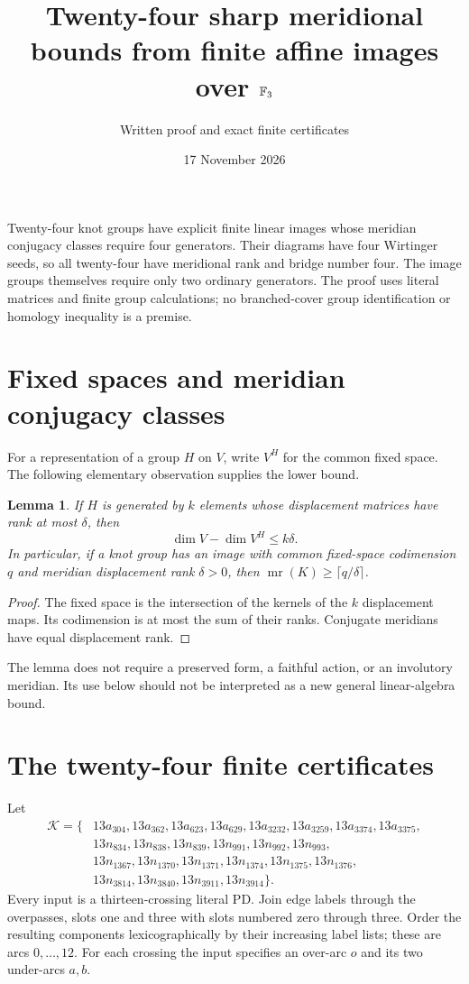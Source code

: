 \documentclass[11pt]{article}
\title{Twenty-four sharp meridional bounds from finite affine images over $\mathbb F_3$}
\author{Written proof and exact finite certificates}
\date{17 November 2026}
\newtheorem{lemma}{Lemma}
\newcommand{\mr}{\operatorname{mr}}
\begin{document}
\maketitle

Twenty-four knot groups have explicit finite linear images whose
meridian conjugacy classes require four generators. Their diagrams
have four Wirtinger seeds, so all twenty-four have meridional rank and
bridge number four. The image groups themselves require only two
ordinary generators. The proof uses literal matrices and finite
group calculations; no branched-cover group identification or
homology inequality is a premise.

\section{Fixed spaces and meridian conjugacy classes}

For a representation of a group $H$ on $V$, write $V^H$ for the
common fixed space. The following elementary observation supplies
the lower bound.

\begin{lemma}\label{lem:fixed}
If $H$ is generated by $k$ elements whose displacement matrices
have rank at most $\delta$, then
\[
                   \dim V-\dim V^H\le k\delta.
\]
In particular, if a knot group has an image with common fixed-space
codimension $q$ and meridian displacement rank $\delta>0$, then
$\mr(K)\ge\lceil q/\delta\rceil$.
\end{lemma}
\begin{proof}
The fixed space is the intersection of the kernels of the $k$
displacement maps. Its codimension is at most the sum of their
ranks. Conjugate meridians have equal displacement rank.
\end{proof}

The lemma does not require a preserved form, a faithful action,
or an involutory meridian. Its use below should not be interpreted
as a new general linear-algebra bound.

\section{The twenty-four finite certificates}

Let
\[
\begin{split}
\mathcal K=\{&13a_{304},13a_{362},13a_{623},13a_{629},
13a_{3232},13a_{3259},13a_{3374},13a_{3375},\\
&13n_{834},13n_{838},13n_{839},13n_{991},13n_{992},13n_{993},\\
&13n_{1367},13n_{1370},13n_{1371},13n_{1374},13n_{1375},13n_{1376},\\
&13n_{3814},13n_{3840},13n_{3911},13n_{3914}\}.
\end{split}
\]
Every input is a thirteen-crossing literal PD. Join edge labels
through the overpasses, slots one and three with slots numbered
zero through three. Order the resulting components lexicographically
by their increasing label lists; these are arcs $0,\ldots,12$.
For each crossing the input specifies an over-arc $o$ and its two
under-arcs $a,b$.
\end{document}
